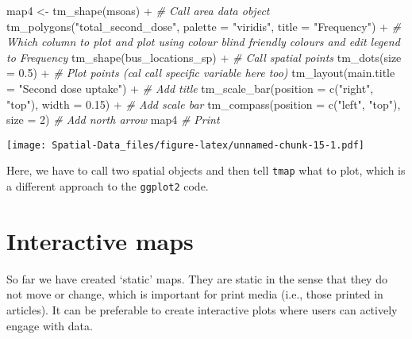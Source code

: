 \documentclass[
]{book}
\newenvironment{Shaded}{\begin{snugshade}}{\end{snugshade}}
\newcommand{\AttributeTok}[1]{\textcolor[rgb]{0.77,0.63,0.00}{#1}}
\newcommand{\CommentTok}[1]{\textcolor[rgb]{0.56,0.35,0.01}{\textit{#1}}}
\newcommand{\DecValTok}[1]{\textcolor[rgb]{0.00,0.00,0.81}{#1}}
\newcommand{\FloatTok}[1]{\textcolor[rgb]{0.00,0.00,0.81}{#1}}
\newcommand{\FunctionTok}[1]{\textcolor[rgb]{0.00,0.00,0.00}{#1}}
\newcommand{\NormalTok}[1]{#1}
\newcommand{\OtherTok}[1]{\textcolor[rgb]{0.56,0.35,0.01}{#1}}
\newcommand{\SpecialCharTok}[1]{\textcolor[rgb]{0.00,0.00,0.00}{#1}}
\newcommand{\StringTok}[1]{\textcolor[rgb]{0.31,0.60,0.02}{#1}}
\begin{document}
\begin{Shaded}
\begin{Highlighting}[]
\NormalTok{map4 }\OtherTok{\textless{}{-}} \FunctionTok{tm\_shape}\NormalTok{(msoas) }\SpecialCharTok{+} \CommentTok{\# Call area data object}
          \FunctionTok{tm\_polygons}\NormalTok{(}\StringTok{"total\_second\_dose"}\NormalTok{, }\AttributeTok{palette =} \StringTok{"viridis"}\NormalTok{, }\AttributeTok{title =} \StringTok{"Frequency"}\NormalTok{) }\SpecialCharTok{+} \CommentTok{\# Which column to plot and plot using colour blind friendly colours and edit legend to \textquotesingle{}Frequency\textquotesingle{}}
        \FunctionTok{tm\_shape}\NormalTok{(bus\_locations\_sp) }\SpecialCharTok{+} \CommentTok{\# Call spatial points}
          \FunctionTok{tm\_dots}\NormalTok{(}\AttributeTok{size =} \FloatTok{0.5}\NormalTok{) }\SpecialCharTok{+} \CommentTok{\# Plot points (cal call specific variable here too)}
        \FunctionTok{tm\_layout}\NormalTok{(}\AttributeTok{main.title =} \StringTok{"Second dose uptake"}\NormalTok{) }\SpecialCharTok{+} \CommentTok{\# Add title}
        \FunctionTok{tm\_scale\_bar}\NormalTok{(}\AttributeTok{position =} \FunctionTok{c}\NormalTok{(}\StringTok{"right"}\NormalTok{, }\StringTok{"top"}\NormalTok{), }\AttributeTok{width =} \FloatTok{0.15}\NormalTok{) }\SpecialCharTok{+} \CommentTok{\# Add scale bar}
        \FunctionTok{tm\_compass}\NormalTok{(}\AttributeTok{position =} \FunctionTok{c}\NormalTok{(}\StringTok{"left"}\NormalTok{, }\StringTok{"top"}\NormalTok{), }\AttributeTok{size =} \DecValTok{2}\NormalTok{) }\CommentTok{\# Add north arrow}
\NormalTok{map4 }\CommentTok{\# Print}
\end{Highlighting}
\end{Shaded}

\texttt{[image: Spatial-Data\_files/figure-latex/unnamed-chunk-15-1.pdf]}

Here, we have to call two spatial objects and then tell \texttt{tmap} what to plot, which is a different approach to the \texttt{ggplot2} code.

\hypertarget{interactive-maps}{%
\section{Interactive maps}\label{interactive-maps}}

So far we have created `static' maps. They are static in the sense that they do not move or change, which is important for print media (i.e., those printed in articles). It can be preferable to create interactive plots where users can actively engage with data.
\end{document}
